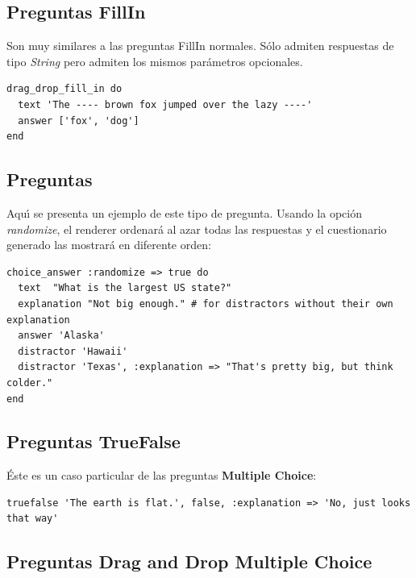 \subsection{Preguntas  FillIn}
\label{subsec:Apendice2.2}

Son muy similares a las preguntas FillIn normales. S\'olo admiten respuestas de tipo \textit{String} pero admiten los mismos par\'ametros opcionales.
\begin{lstlisting}
drag_drop_fill_in do
  text 'The ---- brown fox jumped over the lazy ----'
  answer ['fox', 'dog']
end
\end{lstlisting}

\subsection{Preguntas }
\label{subsec:Apendice2.3}

Aqu\'{\i} se presenta un ejemplo de este tipo de pregunta. Usando la opci\'on \textit{randomize}, el renderer ordenar\'a al azar todas las respuestas
y el cuestionario generado las mostrar\'a en diferente orden:
\begin{lstlisting}
choice_answer :randomize => true do
  text  "What is the largest US state?"
  explanation "Not big enough." # for distractors without their own explanation
  answer 'Alaska'
  distractor 'Hawaii'
  distractor 'Texas', :explanation => "That's pretty big, but think colder."
end
\end{lstlisting}

\subsection{Preguntas TrueFalse}
\label{subsec:Apendice2.4}

\'Este es un caso particular de las preguntas {\bfseries Multiple Choice}:
\begin{lstlisting}
truefalse 'The earth is flat.', false, :explanation => 'No, just looks that way'
\end{lstlisting}

\subsection{Preguntas Drag and Drop Multiple Choice}
\label{subsec:Apendice2.5}


